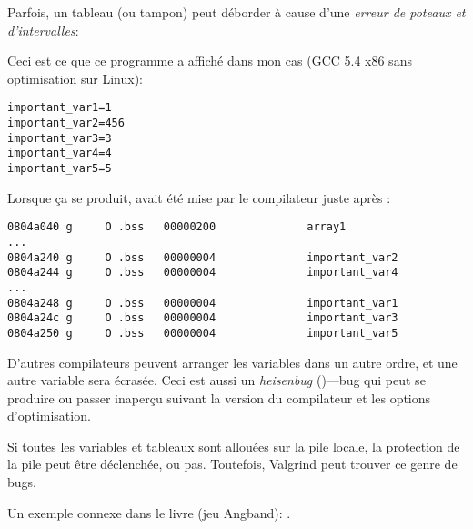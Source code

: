 \label{GlobalArraysOverflowHeisenbug}

Parfois, un tableau (ou tampon) peut déborder à cause d'une \emph{erreur de poteaux et d'intervalles}:



Ceci est ce que ce programme a affiché dans mon cas (GCC 5.4 x86 sans optimisation sur Linux):

\begin{lstlisting}
important_var1=1
important_var2=456
important_var3=3
important_var4=4
important_var5=5
\end{lstlisting}

Lorsque ça se produit,  avait été mise par le compilateur juste
après :

\begin{lstlisting}[caption=objdump -x]
0804a040 g     O .bss   00000200              array1
...
0804a240 g     O .bss   00000004              important_var2
0804a244 g     O .bss   00000004              important_var4
...
0804a248 g     O .bss   00000004              important_var1
0804a24c g     O .bss   00000004              important_var3
0804a250 g     O .bss   00000004              important_var5
\end{lstlisting}

D'autres compilateurs peuvent arranger les variables dans un autre ordre, et une autre
variable sera écrasée.
Ceci est aussi un \emph{heisenbug} ()---bug qui peut se produire
ou passer inaperçu suivant la version du compilateur et les options d'optimisation.

Si toutes les variables et tableaux sont allouées sur la pile locale, la protection
de la pile peut être déclenchée, ou pas.
Toutefois, Valgrind peut trouver ce genre de bugs.

Un exemple connexe dans le livre (jeu Angband): .

